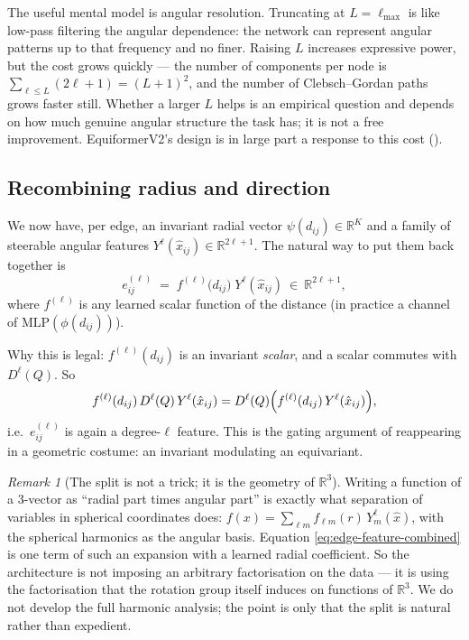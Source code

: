 \documentclass[11pt,a4paper]{report}
\theoremstyle{definition}
\theoremstyle{remark}
\newtheorem{remark}[remark]{Remark}
\newcommand{\RR}{\mathbb R}
\begin{document}
The useful mental model is angular resolution. Truncating at $L=\ell_{\max}$
is like low-pass filtering the angular dependence: the network can represent
angular patterns up to that frequency and no finer. Raising $L$ increases
expressive power, but the cost grows quickly --- the number of components per
node is $\sum_{\ell\le L}(2\ell+1)=(L+1)^2$, and the number of
Clebsch--Gordan paths grows faster still. Whether a larger $L$ helps is an
empirical question and depends on how much genuine angular structure the task
has; it is not a free improvement. EquiformerV2's design is in large part a
response to this cost ().

\subsection{Recombining radius and direction}
\label{sec:recombine-radial-angular}

We now have, per edge, an invariant radial vector $\psi(d_{ij})\in\RR^K$ and
a family of steerable angular features $Y^\ell(\hat x_{ij})\in\RR^{2\ell+1}$.
The natural way to put them back together is
\begin{equation}
\label{eq:edge-feature-combined}
e^{(\ell)}_{ij} \;=\; f^{(\ell)}\bigl(d_{ij}\bigr)\;Y^\ell(\hat x_{ij})
\ \in\ \RR^{2\ell+1},
\end{equation}
where $f^{(\ell)}$ is any learned scalar function of the distance (in
practice a channel of $\mathrm{MLP}(\phi(d_{ij}))$).

Why this is legal: $f^{(\ell)}(d_{ij})$ is an invariant \emph{scalar}, and a
scalar commutes with $D^\ell(Q)$. So
\[
f^{(\ell)}(d_{ij})\,D^\ell(Q)\,Y^\ell(\hat x_{ij})
= D^\ell(Q)\Bigl(f^{(\ell)}(d_{ij})\,Y^\ell(\hat x_{ij})\Bigr),
\]
i.e.\ $e^{(\ell)}_{ij}$ is again a degree-$\ell$ feature. This is the gating
argument of  reappearing in a geometric costume: an
invariant modulating an equivariant.

\begin{remark}[The split is not a trick; it is the geometry of $\RR^3$]
\label{rem:sph-coords-analogy}
Writing a function of a $3$-vector as ``radial part times angular part'' is
exactly what separation of variables in spherical coordinates does:
$f(x)=\sum_{\ell m}f_{\ell m}(r)\,Y^\ell_m(\hat x)$, with the spherical
harmonics as the angular basis. Equation
\eqref{eq:edge-feature-combined} is one term of such an expansion with a
learned radial coefficient. So the architecture is not imposing an arbitrary
factorisation on the data --- it is using the factorisation that the
rotation group itself induces on functions of $\RR^3$. We do not develop the
full harmonic analysis; the point is only that the split is natural rather
than expedient.
\end{remark}
\end{document}
